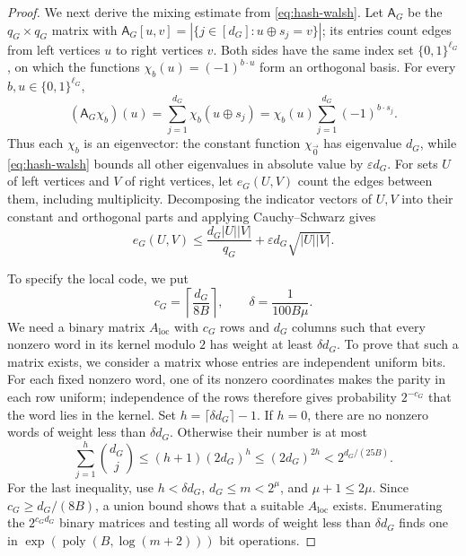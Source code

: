 \documentclass[11pt,reqno]{amsart}
\numberwithin{equation}{section}
\theoremstyle{definition}\newtheorem{definition}[theorem]{Definition}
\theoremstyle{remark}\newtheorem{remark}[theorem]{Remark}
\newcommand{\poly}{\operatorname{poly}}
\renewcommand{\le}{\leqslant}
\renewcommand{\ge}{\geqslant}
\begin{document}
\begin{proof}
We next derive the mixing estimate from \eqref{eq:hash-walsh}.
Let $\mathsf A_G$ be the $q_G\times q_G$ matrix with
$\mathsf A_G[u,v]=|\{j\in[d_G]:u\oplus s_j=v\}|$; its entries
count edges from left vertices $u$ to right vertices $v$.
Both sides have the same index set $\{0,1\}^{\ell_G}$, on which
the functions $\chi_b(u)=(-1)^{b\cdot u}$ form an orthogonal basis.
For every $b,u\in\{0,1\}^{\ell_G}$,
\[
 (\mathsf A_G\chi_b)(u)
 =\sum_{j=1}^{d_G}\chi_b(u\oplus s_j)
 =\chi_b(u)\sum_{j=1}^{d_G}(-1)^{b\cdot s_j}.
\]
Thus each $\chi_b$ is an eigenvector: the constant function
$\chi_{\vec{0}}$ has eigenvalue $d_G$, while
\eqref{eq:hash-walsh} bounds all other eigenvalues in absolute value
by $\varepsilon d_G$.
For sets $U$ of left vertices and $V$ of right vertices, let
$e_G(U,V)$ count the edges between them, including multiplicity.
Decomposing the indicator vectors of $U,V$
into their constant and orthogonal parts and applying
Cauchy--Schwarz gives
\begin{equation}\label{eq:hash-mixing}
 e_G(U,V)\le
 \frac{d_G|U||V|}{q_G}
 +\varepsilon d_G\sqrt{|U||V|}.
\end{equation}

To specify the local code, we put
\[
 c_G=\left\lceil\frac{d_G}{8B}\right\rceil,
 \qquad \delta=\frac1{100B\mu}.
\]
We need a binary matrix $A_{\mathrm{loc}}$ with $c_G$ rows and
$d_G$ columns such that every nonzero word in its kernel modulo $2$
has weight at least $\delta d_G$. To prove that such a matrix exists,
we consider a matrix whose entries are independent uniform bits.
For each fixed nonzero word, one of
its nonzero coordinates makes the parity in each row uniform;
independence of the rows therefore gives probability $2^{-c_G}$
that the word lies in the kernel.
Set $h=\lceil\delta d_G\rceil-1$. If $h=0$, there are
no nonzero words of weight less than $\delta d_G$. Otherwise their
number is at most
\[
 \sum_{j=1}^{h}\binom{d_G}{j}
 \le(h+1)(2d_G)^h
 \le(2d_G)^{2h}
 <2^{d_G/(25B)}.
\]
For the last inequality, use $h<\delta d_G$, $d_G\le m<2^\mu$,
and $\mu+1\le2\mu$. Since $c_G\ge d_G/(8B)$, a union bound shows
that a suitable $A_{\mathrm{loc}}$ exists. Enumerating the
$2^{c_Gd_G}$ binary matrices and testing all words of weight less
than $\delta d_G$ finds one in
$\exp(\poly(B,\log(m+2)))$ bit operations.


\end{proof}
\end{document}
